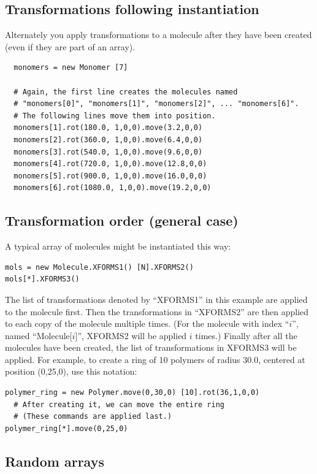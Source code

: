 \documentclass[11pt]{article}
\begin{document}
\subsection{Transformations following instantiation}
\label{sec:xform_after_instance}
Alternately you apply transformations to a molecule 
after they have been created (even if they are part of an array).
\begin{verbatim}
  monomers = new Monomer [7]

  # Again, the first line creates the molecules named 
  # "monomers[0]", "monomers[1]", "monomers[2]", ... "monomers[6]".
  # The following lines move them into position.
  monomers[1].rot(180.0, 1,0,0).move(3.2,0,0)
  monomers[2].rot(360.0, 1,0,0).move(6.4,0,0)
  monomers[3].rot(540.0, 1,0,0).move(9.6,0,0)
  monomers[4].rot(720.0, 1,0,0).move(12.8,0,0)
  monomers[5].rot(900.0, 1,0,0).move(16.0,0,0)
  monomers[6].rot(1080.0, 1,0,0).move(19.2,0,0)
\end{verbatim}

\subsection{Transformation order (general case)}
\label{sec:xform_order}
A typical array of molecules might be instantiated this way:
\begin{verbatim}
mols = new Molecule.XFORMS1() [N].XFORMS2()
mols[*].XFORMS3()
\end{verbatim}
The list of transformations denoted by ``XFORMS1'' in this example
are applied to the molecule first.
Then the transformations in ``XFORMS2'' are then applied to each
copy of the molecule multiple times.  
(For the molecule with index ``$i$'', named ``Molecule[$i$]'',
XFORMS2 will be applied $i$ times.)
Finally after all the molecules have been created, the list
of transformations in XFORMS3 will be applied.
For example, to create a ring of 10 polymers of radius 30.0, 
centered at position (0,25,0), use this notation:
\begin{verbatim}
polymer_ring = new Polymer.move(0,30,0) [10].rot(36,1,0,0)
  # After creating it, we can move the entire ring 
  # (These commands are applied last.)
polymer_ring[*].move(0,25,0)
\end{verbatim}


\subsection{Random arrays}
\label{sec:random_arrays}
\end{document}
